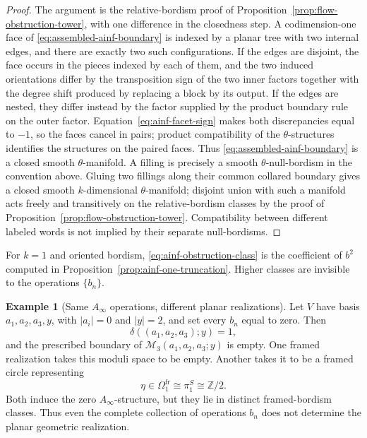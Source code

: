 \documentclass[11pt,letterpaper,twoside]{article}
\theoremstyle{plain}
\theoremstyle{definition}
\newtheorem{example}[theorem]{Example}
\theoremstyle{remark}
\newcommand{\Ainf}{A_\infty}
\begin{document}
\begin{proof}
The argument is the relative-bordism proof of Proposition~\ref{prop:flow-obstruction-tower}, with one difference in the closedness step.  A codimension-one face of \eqref{eq:assembled-ainf-boundary} is indexed by a planar tree with two internal edges, and there are exactly two such configurations.  If the edges are disjoint, the face occurs in the pieces indexed by each of them, and the two induced orientations differ by the transposition sign of the two inner factors together with the degree shift produced by replacing a block by its output.  If the edges are nested, they differ instead by the factor supplied by the product boundary rule on the outer factor.  Equation~\eqref{eq:ainf-facet-sign} makes both discrepancies equal to \(-1\), so the faces cancel in pairs; product compatibility of the \(\theta\)-structures identifies the structures on the paired faces.  Thus \eqref{eq:assembled-ainf-boundary} is a closed smooth \(\theta\)-manifold.  A filling is precisely a smooth \(\theta\)-null-bordism in the convention above.  Gluing two fillings along their common collared boundary gives a closed smooth \(k\)-dimensional \(\theta\)-manifold; disjoint union with such a manifold acts freely and transitively on the relative-bordism classes by the proof of Proposition~\ref{prop:flow-obstruction-tower}.  Compatibility between different labeled words is not implied by their separate null-bordisms.
\end{proof}

For \(k=1\) and oriented bordism, \eqref{eq:ainf-obstruction-class} is the coefficient of \(b^2\) computed in Proposition~\ref{prop:ainf-one-truncation}.  Higher classes are invisible to the operations \(\{b_n\}\).

\begin{example}[Same \(\Ainf\) operations, different planar realizations]\label{ex:ainf-eta}
Let \(V\) have basis \(a_1,a_2,a_3,y\), with \(|a_i|=0\) and \(|y|=2\), and set every \(b_n\) equal to zero.  Then
\[
 \delta((a_1,a_2,a_3);y)=1,
\]
and the prescribed boundary of \(\mathcal M_3(a_1,a_2,a_3;y)\) is empty.  One framed realization takes this moduli space to be empty.  Another takes it to be a framed circle representing
\[
 \eta\in\Omega_1^{\mathrm{fr}}\cong\pi_1^S\cong\mathbb Z/2.
\]
Both induce the zero \(\Ainf\)-structure, but they lie in distinct framed-bordism classes.  Thus even the complete collection of operations \(b_n\) does not determine the planar geometric realization.
\end{example}
\end{document}
